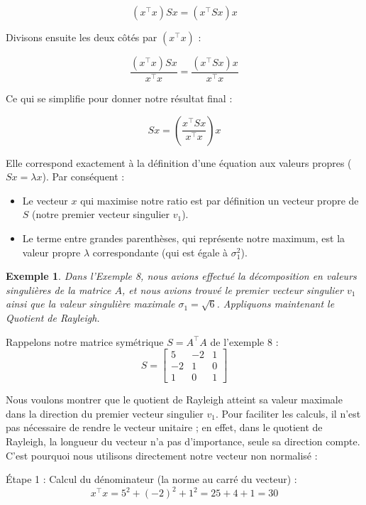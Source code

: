 \documentclass[12pt]{report}
\newtheorem{example}{Exemple}
\begin{document}
$$(x^{\top} x) Sx = (x^{\top} Sx) x$$

\noindent Divisons ensuite les deux côtés par $(x^{\top} x)$ :

$$\frac{(x^{\top} x) Sx}{x^{\top} x} = \frac{(x^{\top} Sx) x}{x^{\top} x}$$

\noindent  Ce qui se simplifie pour donner notre résultat final :

$$Sx = \left( \frac{x^{\top} Sx}{x^{\top} x} \right) x$$

\noindent Elle correspond exactement à la définition d'une équation aux valeurs propres ($Sx = \lambda x$). Par conséquent :
\begin{itemize}
    \item Le vecteur $x$ qui maximise notre ratio est par définition un {vecteur propre} de $S$ (notre premier vecteur singulier $v_1$).
    \item Le terme entre grandes parenthèses, qui représente notre maximum, est la {valeur propre} $\lambda$ correspondante (qui est égale à $\sigma_1^2$).
\end{itemize}

\begin{example}
    \noindent Dans l'Exemple 8, nous avions effectué la décomposition en valeurs singulières de la matrice $A$, et nous avions trouvé le premier vecteur singulier $v_1$ ainsi que la valeur singulière maximale $\sigma_1 = \sqrt{6}$. Appliquons maintenant le Quotient de Rayleigh.
\end{example}

\noindent Rappelons notre matrice symétrique $S = A^{\top} A$ de l'exemple 8  :
$$S = \begin{bmatrix} 5 & -2 & 1 \\ -2 & 1 & 0 \\ 1 & 0 & 1 \end{bmatrix}$$

\noindent Nous voulons montrer que le quotient de Rayleigh atteint sa valeur maximale dans la direction du premier vecteur singulier $v_1$. Pour faciliter les calculs, il n'est pas nécessaire de rendre le vecteur unitaire ; en effet, dans le quotient de Rayleigh, la longueur du vecteur n'a pas d'importance, seule sa direction compte. C'est pourquoi nous utilisons directement notre vecteur non normalisé :

Étape 1 : Calcul du dénominateur (la norme au carré du vecteur) :
$$x^{\top} x = 5^2 + (-2)^2 + 1^2 = 25 + 4 + 1 = 30$$
\end{document}

